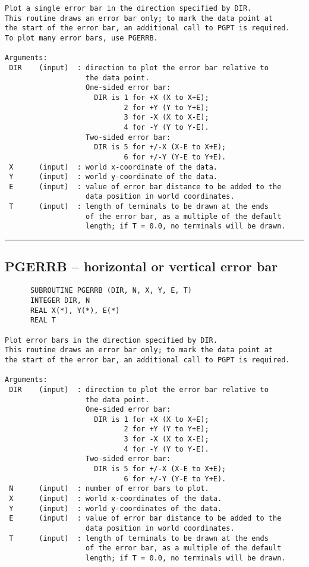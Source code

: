 {\begin{verbatim}
Plot a single error bar in the direction specified by DIR.
This routine draws an error bar only; to mark the data point at
the start of the error bar, an additional call to PGPT is required.
To plot many error bars, use PGERRB.

Arguments:
 DIR    (input)  : direction to plot the error bar relative to
                   the data point. 
                   One-sided error bar:
                     DIR is 1 for +X (X to X+E);
                            2 for +Y (Y to Y+E);
                            3 for -X (X to X-E);
                            4 for -Y (Y to Y-E).
                   Two-sided error bar:
                     DIR is 5 for +/-X (X-E to X+E); 
                            6 for +/-Y (Y-E to Y+E).
 X      (input)  : world x-coordinate of the data.
 Y      (input)  : world y-coordinate of the data.
 E      (input)  : value of error bar distance to be added to the
                   data position in world coordinates.
 T      (input)  : length of terminals to be drawn at the ends
                   of the error bar, as a multiple of the default
                   length; if T = 0.0, no terminals will be drawn.
\end{verbatim}
\hrule


\subsection*{PGERRB -- horizontal or vertical error bar }
\begin{verbatim}
      SUBROUTINE PGERRB (DIR, N, X, Y, E, T)
      INTEGER DIR, N
      REAL X(*), Y(*), E(*)
      REAL T

Plot error bars in the direction specified by DIR.
This routine draws an error bar only; to mark the data point at
the start of the error bar, an additional call to PGPT is required.

Arguments:
 DIR    (input)  : direction to plot the error bar relative to
                   the data point. 
                   One-sided error bar:
                     DIR is 1 for +X (X to X+E);
                            2 for +Y (Y to Y+E);
                            3 for -X (X to X-E);
                            4 for -Y (Y to Y-E).
                   Two-sided error bar:
                     DIR is 5 for +/-X (X-E to X+E); 
                            6 for +/-Y (Y-E to Y+E).
 N      (input)  : number of error bars to plot.
 X      (input)  : world x-coordinates of the data.
 Y      (input)  : world y-coordinates of the data.
 E      (input)  : value of error bar distance to be added to the
                   data position in world coordinates.
 T      (input)  : length of terminals to be drawn at the ends
                   of the error bar, as a multiple of the default
                   length; if T = 0.0, no terminals will be drawn.


\end{verbatim}}
